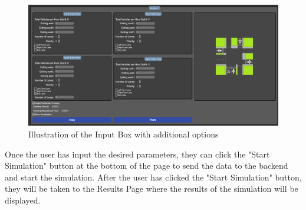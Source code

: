 \documentclass{article}
\begin{document}
    \begin{figure}[H]
        \centering
        \includegraphics[width=\textwidth]{inputExtra}
        \caption{Illustration of the Input Box with additional options}
        \label{fig:inputExtra}
    \end{figure}

    Once the user has input the desired parameters, they can click the "Start Simulation" button at the bottom of the page to send the data to the backend and start the simulation. After the user has clicked the "Start Simulation" button, they
    will be taken to the Results Page where the results of the simulation will be displayed.
\end{document}
